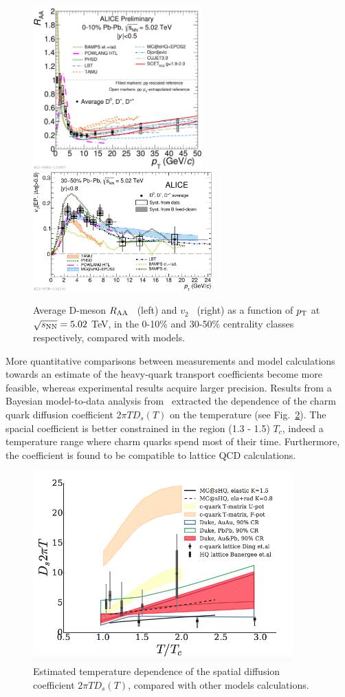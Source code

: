 \begin{figure}[!ht]
  \centering
    \includegraphics[width=6.5cm]{FigCap2/2017-Jul-07-DmesonAverage_010_All_Models_04July2017.pdf}
    \includegraphics[width=7cm]{FigCap2/2017-Jul-04-DmesonComparisonWithModels.pdf}
  \caption{Average D-meson $R_{\rm AA}$~\cite{ALICE-PUBLIC-2017-003} (left) and $v_2$~\cite{Acharya:2017qps} (right) as a function of $p_{\rm T}$ at $\sqrt{s_{\rm NN}} = 5.02$ TeV, in the 0-10\% and 30-50\% centrality classes respectively, compared with models.}
  \label{fig:RAAandv2}
\end{figure}

More quantitative comparisons between measurements and model
calculations towards an estimate of the heavy-quark transport coefficients
become more feasible, whereas experimental results acquire larger precision.
Results from a Bayesian model-to-data analysis from~\cite{Xu:2017hgt} extracted the dependence of
the charm quark diffusion coefficient 2$\pi T D_s(T)$ on the temperature (see Fig.~\ref{fig:DiffCoeff}).
The spacial coefficient is better constrained in the region (1.3 - 1.5) $T_c$, indeed a 
temperature range where charm quarks spend most of their time.
Furthermore, the coefficient is found to be compatible to lattice QCD calculations.

\begin{figure}[!ht]
  \centering
    \includegraphics[width=10cm]{FigCap2/DiffCoeff.png}
  \caption{Estimated temperature dependence of the spatial diffusion coefficient  2$\pi T D_s(T)$, compared with other models calculations.}
  \label{fig:DiffCoeff}
\end{figure}


